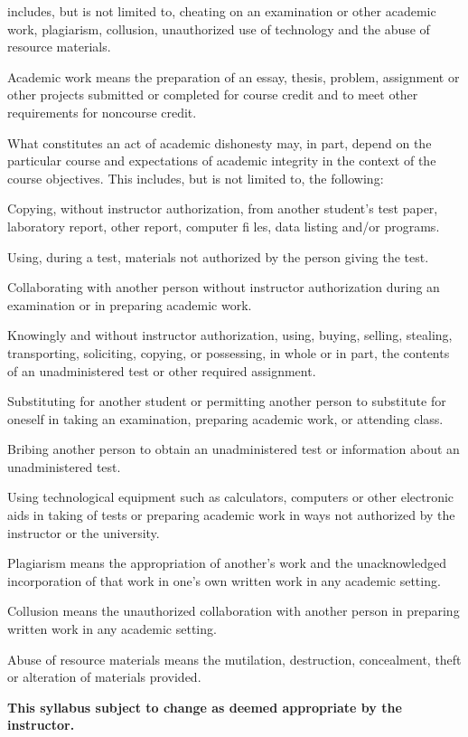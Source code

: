 \documentclass[letterpaper]{article}
\begin{document}
 includes, but is not limited to, cheating on an examination or other academic work, plagiarism, collusion, unauthorized use of technology and the abuse of resource materials.
\ben
  \item Academic work means the preparation of an essay, thesis, problem, assignment or other projects submitted or completed for course credit and to meet other requirements for noncourse credit.
  \item What constitutes an act of academic dishonesty may, in part, depend on the particular course and expectations of academic integrity in the context of the course objectives. This includes, but is not limited to, the following:
  \ben
    \item Copying, without instructor authorization, from another student's test paper, laboratory report, other report, computer fi les, data listing and/or programs.
    \item Using, during a test, materials not authorized by the person giving the test. 
    \item Collaborating with another person without instructor authorization during an examination or in preparing academic work.
    \item Knowingly and without instructor authorization, using, buying, selling, stealing, transporting, soliciting, copying, or possessing, in whole or in part, the contents of an unadministered test or other required assignment.
    \item Substituting for another student or permitting another person to substitute for oneself in taking an examination, preparing academic work, or attending class.
    \item Bribing another person to obtain an unadministered test or information about an unadministered test.
    \item Using technological equipment such as calculators, computers or other electronic aids in taking of tests or preparing academic work in ways not authorized by the instructor or the university.
  \een
  \item Plagiarism means the appropriation of another's work and the unacknowledged incorporation of that work in one's own written work in any academic setting. 
  \item Collusion means the unauthorized collaboration with another person in preparing written work in any academic setting.
  \item Abuse of resource materials means the mutilation, destruction, concealment, theft or alteration of materials provided.
\een

\begin{center}
	\textbf{This syllabus subject to change as deemed appropriate by the instructor.}
\end{center}
\end{document}
